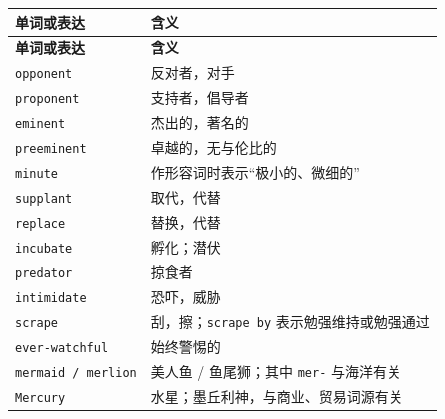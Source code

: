 \documentclass[UTF8,zihao=-4]{ctexart}
\begin{document}
\begin{longtable}{>{\raggedright\arraybackslash}p{4.6cm} >{\raggedright\arraybackslash}p{9.9cm}}
\toprule
\textbf{单词或表达} & \textbf{含义} \\
\midrule
\endfirsthead
\toprule
\textbf{单词或表达} & \textbf{含义} \\
\midrule
\endhead
\texttt{opponent} & 反对者，对手 \\
\texttt{proponent} & 支持者，倡导者 \\
\texttt{eminent} & 杰出的，著名的 \\
\texttt{preeminent} & 卓越的，无与伦比的 \\
\texttt{minute} & 作形容词时表示“极小的、微细的” \\
\texttt{supplant} & 取代，代替 \\
\texttt{replace} & 替换，代替 \\
\texttt{incubate} & 孵化；潜伏 \\
\texttt{predator} & 掠食者 \\
\texttt{intimidate} & 恐吓，威胁 \\
\texttt{scrape} & 刮，擦；\texttt{scrape by} 表示勉强维持或勉强通过 \\
\texttt{ever-watchful} & 始终警惕的 \\
\texttt{mermaid / merlion} & 美人鱼 / 鱼尾狮；其中 \texttt{mer-} 与海洋有关 \\
\texttt{Mercury} & 水星；墨丘利神，与商业、贸易词源有关 \\
\bottomrule
\end{longtable}
\end{document}
